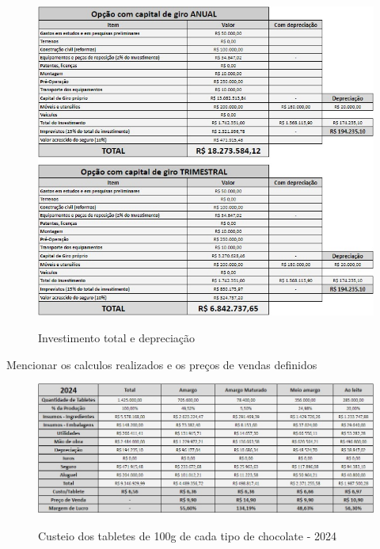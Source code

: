 \documentclass[
	12pt,				%
	openright,			%
	oneside,			%
	a4paper,			%
	english,			%
	french,				%
	spanish,			%
	brazil				%
	]{abntex2}
\begin{document}
\begin{figure}[H]
\begin{center}
\caption{Investimento total e depreciação}
\includegraphics[scale=0.7]{6.jpeg} 
\label{-}
\end{center}
\end{figure}

Mencionar os calculos realizados e os preços de vendas definidos

\begin{figure}[H]
\begin{center}
\caption{Custeio dos tabletes de 100g de cada tipo de chocolate - 2024}
\includegraphics[scale=0.5]{7.jpeg} 
\label{-}
\end{center}
\end{figure}
\end{document}
